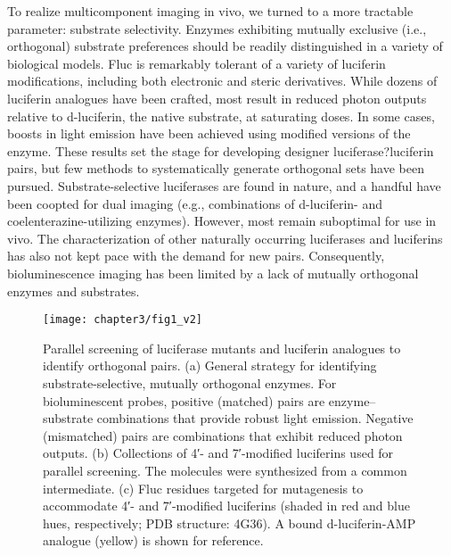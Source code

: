 To realize multicomponent imaging in vivo, we turned to a more tractable parameter: substrate selectivity. Enzymes exhibiting mutually exclusive (i.e., orthogonal) substrate preferences should be readily distinguished in a variety of biological models. Fluc is remarkably tolerant of a variety of luciferin modifications, including both electronic\cite{Woodroofe:2012vx,McCutcheon:2012ixb,Conley:2012gha,Kuchimaru:2016eba,BRANCHING:1989ct} and steric\cite{Steinhardt:2016in,Jones:2017be,Jathoul:2014do,Woodroofe:2008faa,Mofford:2014iwa} derivatives. While dozens of luciferin analogues have been crafted, most result in reduced photon outputs relative to d-luciferin, the native substrate, at saturating doses.\cite{Rathbun:2017kj} In some cases, boosts in light emission have been achieved using modified versions of the enzyme.\cite{Mofford:2014iwa,Jones:2017be} These results set the stage for developing designer luciferase?luciferin pairs, but few methods to systematically generate orthogonal sets have been pursued.\cite{Jones:2017be,Nishihara:2017bd} Substrate-selective luciferases are found in nature, and a handful have been coopted for dual imaging (e.g., combinations of d-luciferin- and coelenterazine-utilizing enzymes).\cite{Petushkov:2014ha,Kaskova:2017ed,Paley:2014ila,Stacer:2013el} However, most remain suboptimal for use in vivo. The characterization of other naturally occurring luciferases and luciferins has also not kept pace with the demand for new pairs. Consequently, bioluminescence imaging has been limited by a lack of mutually orthogonal enzymes and substrates.
\par
\begin{figure}[htb]
\texttt{[image: chapter3/fig1\_v2]}
\centering
\caption[Parallel screening of luciferase mutants and luciferin analogues to identify orthogonal pairs]{Parallel screening of luciferase mutants and luciferin analogues to identify orthogonal pairs. (a) General strategy for identifying substrate-selective, mutually orthogonal enzymes. For bioluminescent probes, positive (matched) pairs are enzyme–substrate combinations that provide robust light emission. Negative (mismatched) pairs are combinations that exhibit reduced photon outputs. (b) Collections of 4′- and 7′-modified luciferins used for parallel screening. The molecules were synthesized from a common intermediate. (c) Fluc residues targeted for mutagenesis to accommodate 4′- and 7′-modified luciferins (shaded in red and blue hues, respectively; PDB structure: 4G36). A bound d-luciferin-AMP analogue (yellow) is shown for reference.}
  \label{fig:overview}
\end{figure}
